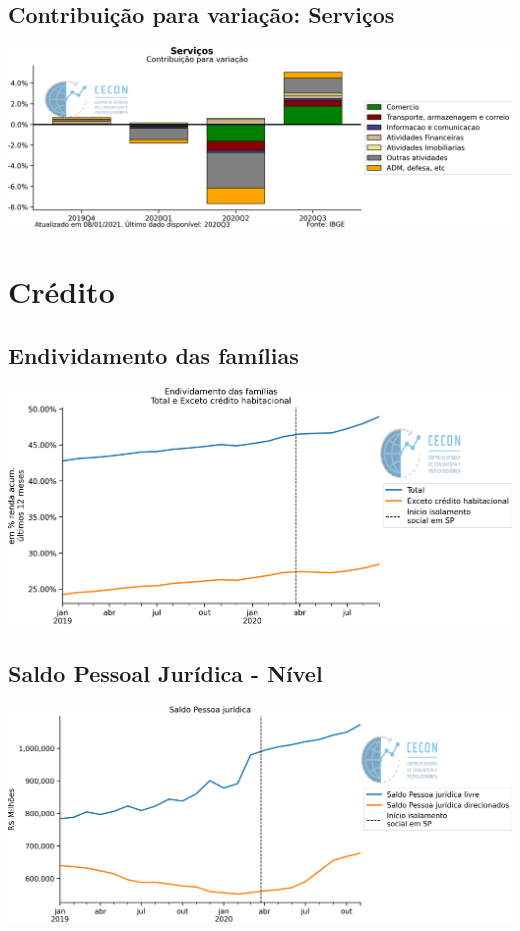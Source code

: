 \documentclass{SelfArx}
\begin{document}
\subsection*{Contribuição para variação: Serviços}
\label{sec:orgee3baa4}

\begin{center}
\includegraphics[width=.9\linewidth]{./figs/PIB/Contrib_Servicos.png}
\end{center}

\section*{Crédito}
\label{sec:org656f27f}

\subsection*{Endividamento das famílias}
\label{sec:orge2710a3}

\begin{center}
\includegraphics[width=.9\linewidth]{./figs/Credito/EndividamentoFamilias.png}
\end{center}


\subsection*{Saldo Pessoal Jurídica - Nível}
\label{sec:org6ad7759}

\begin{center}
\includegraphics[width=.9\linewidth]{./figs/Credito/SaldoPJ.png}
\end{center}
\end{document}
